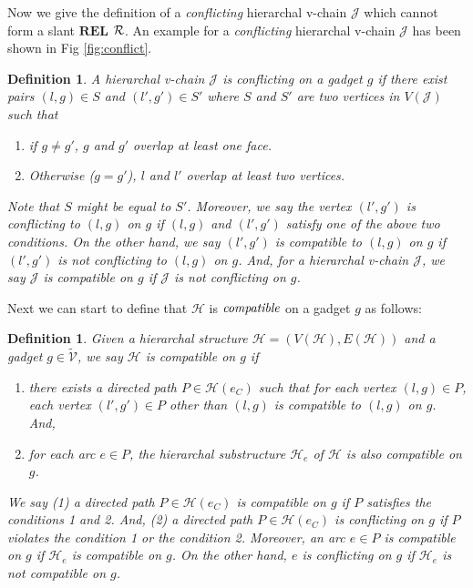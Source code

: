 \documentclass[11pt]{article}
\newcommand{\R}{{\cal R}}
\newcommand{\HH}{\mathcal{H}}
\newcommand{\VV}{\mathcal{V}}
\newcommand{\JJ}{\mathcal{J}}
\newcommand{\REL}{\mathbf{REL}}
\newtheorem{definition}[figure]{Definition}
\begin{document}
Now we give the definition of a \emph{conflicting} hierarchal v-chain $\JJ$ which
cannot form a slant $\REL$ $\R$. An example for
a \emph{conflicting} hierarchal v-chain $\JJ$ has been shown in Fig \ref{fig:conflict}.
\begin{definition}\label{def:non-conflicting-v-chain}
A hierarchal v-chain $\JJ$
is \emph{conflicting} on a gadget $g$ if
there exist pairs $(l, g)\in S$ and $(l', g')\in S'$ where
$S$ and $S'$ are two vertices in $V(\JJ)$
such that
\begin{enumerate}
\item if $g \neq g'$, $g$ and $g'$ overlap at least one face.
\item Otherwise ($g = g'$), $l$ and $l'$ overlap at least two vertices.
\end{enumerate}
Note that $S$ might be equal to $S'$.
Moreover, we say
the vertex $(l', g')$ is \emph{conflicting} to $(l, g)$ on $g$
if $(l, g)$ and $(l', g')$ satisfy one of the above two conditions.
On the other hand,
we say $(l', g')$ is \emph{compatible} to $(l, g)$ on $g$
if $(l', g')$ is not conflicting to $(l, g)$ on $g$.
And,
for a hierarchal v-chain $\JJ$, we say $\JJ$ is \emph{compatible} on $g$
if $\JJ$ is not conflicting on $g$.
\end{definition}


Next we can start to define that
$\HH$ is $\emph{compatible}$ on a gadget $g$
as follows:
\begin{definition}
Given a hierarchal structure $\HH=(V(\HH), E(\HH))$ and a gadget $g\in \tilde{\VV}$,
we say $\HH$ is \emph{compatible} on $g$ if
\begin{enumerate}
\item there exists a directed path $P\in \HH(e_C)$ such that
for each vertex $(l, g)\in P$,
each vertex $(l', g')\in P$ other than $(l, g)$
is compatible to $(l, g)$ on $g$. And,
\item for each arc $e\in P$,
the hierarchal substructure $\HH_e$ of $\HH$ is also compatible on $g$.
\end{enumerate}
We say (1) a directed path $P\in \HH(e_C)$ is \emph{compatible} on $g$
if $P$ satisfies the conditions 1 and 2. And,
(2) a directed path $P\in \HH(e_C)$ is \emph{conflicting} on $g$
if $P$ violates the condition 1 or the condition 2.
Moreover, an arc $e\in P$ is \emph{compatible}
on $g$ if
$\HH_e$ is compatible on $g$.
On the other hand, $e$ is \emph{conflicting} on $g$ if
$\HH_e$ is not compatible on $g$.
\end{definition}
\end{document}
